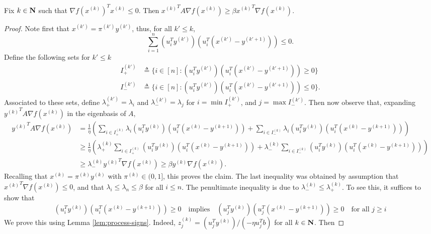 \documentclass[11pt]{article}
\begin{document}
\begin{lem}\label{lem:inner-prod2}
  Fix $k \in \mathbf{N}$ such that $\nabla f(x^{(k)})^T x^{(k)} \leq 0$. Then ${x^{(k)}}^T A \nabla f(x^{(k)}) \geq \beta {x^{(k)}}^T \nabla f(x^{(k)})$. 
\end{lem}
\begin{proof}
  Note first that $x^{(k')} = \pi^{(k')}y^{(k')}$, thus, for all $k' \leq k$, 
  \[
  \sum_{i=1}^n (u_i^Ty^{(k')})(u_i^T(x^{(k')} - y^{(k' + 1)})) \leq 0.
  \]
  Define the following sets for $k' \leq k$
  \begin{align*}
    I^{(k')}_+ &\triangleq \{i \in [n] : (u_i^Ty^{(k')})(u_i^T(x^{(k')} - y^{(k' + 1)})) \geq 0\}\\
    I^{(k')}_- &\triangleq \{i \in [n] : (u_i^Ty^{(k')})(u_i^T(x^{(k')} - y^{(k' + 1)})) \leq 0\}.
  \end{align*}
  Associated to these sets, define $\lambda_+^{(k')} = \lambda_i$ and $\lambda_{-}^{(k')} = \lambda_j$ for
  $i = \min I^{(k')}_+$, and $j = \max I_-^{(k')}$. 
  Then now observe that, expanding ${y^{(k)}}^T A \nabla f(x^{(k)})$ in the eigenbasis of $A$,
  \begin{align*}
    {y^{(k)}} ^T A \nabla f(x^{(k)}) &= \frac{1}{\eta}\left(
    \sum_{i \in I_+^{(k)}} \lambda_i  (u_i^Ty^{(k)})(u_i^T(x^{(k)} - y^{(k + 1)})) +
    \sum_{i \in I_-^{(k)}} \lambda_i  (u_i^Ty^{(k)})(u_i^T(x^{(k)} - y^{(k + 1)}))\right) \\
    &\geq \frac{1}{\eta}\left(
    \lambda_+^{(k)} \sum_{i \in I_+^{(k)}} (u_i^Ty^{(k)})(u_i^T(x^{(k)} - y^{(k + 1)})) +
    \lambda_-^{(k)} \sum_{i \in I_-^{(k)}} (u_i^Ty^{(k)})(u_i^T(x^{(k)} - y^{(k + 1)}))\right) \\
    &\geq \lambda_-^{(k)}{y^{(k)}}^T\nabla f(x^{(k)}) \geq \beta y^{(k)} \nabla f(x^{(k)}). 
  \end{align*}
  Recalling that $x^{(k)} = \pi^{(k)} y^{(k)}$ with $\pi^{(k)} \in (0, 1]$, this proves the claim.
    The last inequality was obtained by assumption that ${x^{(k)}}^T \nabla f(x^{(k)}) \leq 0$, and that
    $\lambda_i \leq \lambda_n \leq \beta$ for all $i \leq n$. The penultimate inequality is due to $\lambda_-^{(k)} \leq \lambda_+^{(k)}$.
  To see this, it suffices to show that
  \begin{equation}\label{disp:suff-condition-signs}
  (u_i^Ty^{(k)})(u_i^T(x^{(k)} - y^{(k + 1)})) \geq 0
  \quad \text{implies} \quad
  (u_j^Ty^{(k)})(u_j^T(x^{(k)} - y^{(k + 1)})) \geq 0 \quad \text{for all $j \geq i$}
  \end{equation}
  We prove this using Lemma \ref{lem:process-signs}. Indeed, $z^{(k)}_j = (u_j^Ty^{(k)})/(-\eta u_j^Tb)$ for all $k \in \mathbf{N}$. Then

\end{proof}
\end{document}
